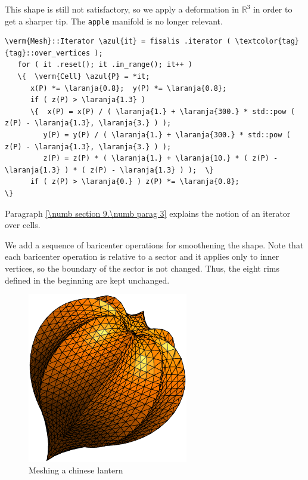 This shape is still not satisfactory, so we apply a deformation in $ \mathbb{R}^3 $ in order to
get a sharper tip.
The {\small\tt apple} manifold is no longer relevant.

\begin{Verbatim}[commandchars=\\\{\},formatcom=\small\tt,frame=single,
   label=parag-\ref{\numb section 2.\numb parag 14}.cpp,rulecolor=\color{moldura},
   baselinestretch=0.94,framesep=2mm]
   \verm{Mesh}::Iterator \azul{it} = fisalis .iterator ( \textcolor{tag}{tag}::over_vertices );
   for ( it .reset(); it .in_range(); it++ )
   \{  \verm{Cell} \azul{P} = *it;
      x(P) *= \laranja{0.8};  y(P) *= \laranja{0.8};
      if ( z(P) > \laranja{1.3} )
      \{  x(P) = x(P) / ( \laranja{1.} + \laranja{300.} * std::pow ( z(P) - \laranja{1.3}, \laranja{3.} ) );
         y(P) = y(P) / ( \laranja{1.} + \laranja{300.} * std::pow ( z(P) - \laranja{1.3}, \laranja{3.} ) );
         z(P) = z(P) * ( \laranja{1.} + \laranja{10.} * ( z(P) - \laranja{1.3} ) * ( z(P) - \laranja{1.3} ) );  \}
      if ( z(P) > \laranja{0.} ) z(P) *= \laranja{0.8};                                        \}
\end{Verbatim}

Paragraph \ref{\numb section 9.\numb parag 3} explains the notion of an iterator over cells.

We add a sequence of baricenter operations for smoothening the shape.
Note that each baricenter operation is relative to a sector and it applies only to inner
vertices, so the boundary of the sector is not changed.
Thus, the eight rims defined in the beginning are kept unchanged.

\begin{figure}[ht] \centering
  \includegraphics[width=70mm]{fisalis}
  \caption{Meshing a chinese lantern}
  \label{\numb section 2.\numb fig 17}
\end{figure}

